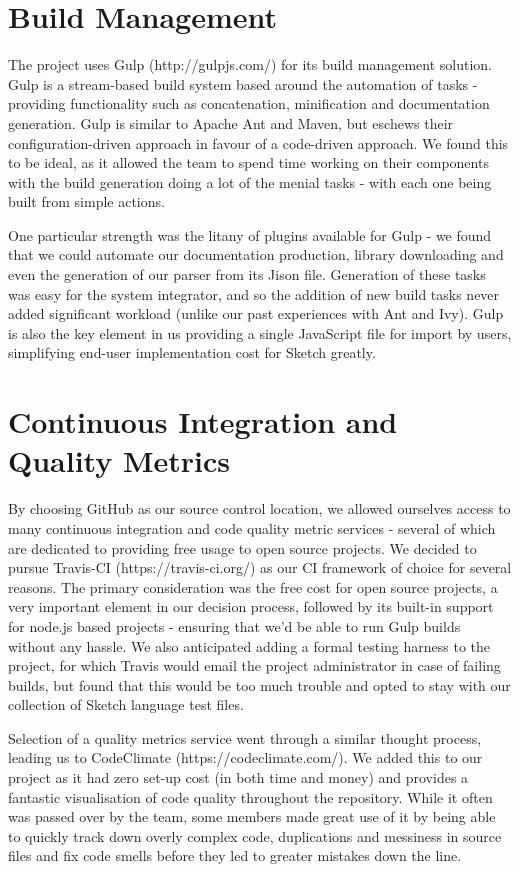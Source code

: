 \documentclass{l3proj}
\begin{document}
\section{Build Management}
\label{dev-build}
The project uses Gulp (http://gulpjs.com/) for its build management solution. Gulp is a stream-based build system based around the automation of tasks - providing functionality such as concatenation, minification and documentation generation. Gulp is similar to Apache Ant and Maven, but eschews their configuration-driven approach in favour of a code-driven approach. We found this to be ideal, as it allowed the team to spend time working on their components with the build generation doing a lot of the menial tasks - with each one being built from simple actions.

One particular strength was the litany of plugins available for Gulp - we found that we could automate our documentation production, library downloading and even the generation of our parser from its Jison file. Generation of these tasks was easy for the system integrator, and so the addition of new build tasks never added significant workload (unlike our past experiences with Ant and Ivy). Gulp is also the key element in us providing a single JavaScript file for import by users, simplifying end-user implementation cost for Sketch greatly.

\section{Continuous Integration and Quality Metrics}
\label{dev-ci}
By choosing GitHub as our source control location, we allowed ourselves access to many continuous integration and code quality metric services - several of which are dedicated to providing free usage to open source projects. We decided to pursue Travis-CI (https://travis-ci.org/) as our CI framework of choice for several reasons. The primary consideration was the free cost for open source projects, a very important element in our decision process, followed by its built-in support for node.js based projects - ensuring that we'd be able to run Gulp builds without any hassle. We also anticipated adding a formal testing harness to the project, for which Travis would email the project administrator in case of failing builds, but found that this would be too much trouble and opted to stay with our collection of Sketch language test files.

Selection of a quality metrics service went through a similar thought process, leading us to CodeClimate (https://codeclimate.com/). We added this to our project as it had zero set-up cost (in both time and money) and provides a fantastic visualisation of code quality throughout the repository. While it often was passed over by the team, some members made great use of it by being able to quickly track down overly complex code, duplications and messiness in source files and fix code smells before they led to greater mistakes down the line.
\end{document}
